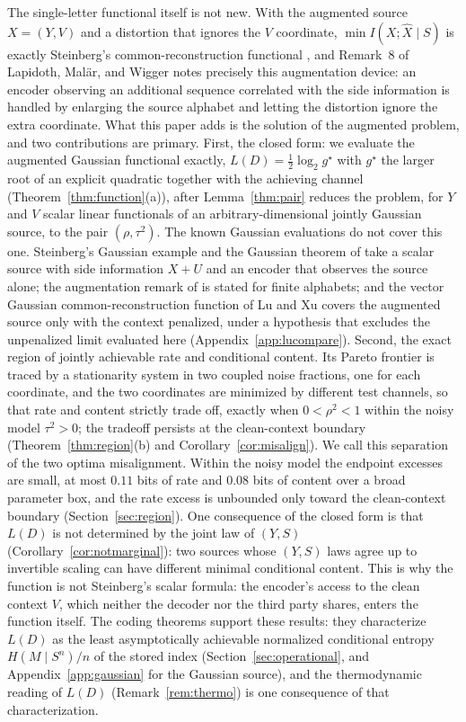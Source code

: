 \documentclass[11pt,onecolumn]{IEEEtran}
\newcommand{\hX}{\widehat{X}}
\begin{document}
The single-letter functional itself is not new. With the augmented source
$X=(Y,V)$ and a distortion that ignores the $V$ coordinate,
$\min I(X;\hX\mid S)$ is exactly Steinberg's common-reconstruction
functional \cite{steinberg2009}, and Remark~8 of Lapidoth, Mal\"ar, and
Wigger \cite{lapidoth2014} notes precisely this augmentation device: an
encoder observing an additional sequence correlated with the side
information is handled by enlarging the source alphabet and letting the
distortion ignore the extra coordinate. What this paper adds is the
solution of the augmented problem, and two contributions are primary.
First, the closed form: we evaluate the augmented Gaussian functional
exactly, $L(D)=\tfrac12\log_2 g^\star$ with $g^\star$ the larger root of
an explicit quadratic together with the achieving channel
(Theorem~\ref{thm:function}(a)), after Lemma~\ref{thm:pair} reduces the
problem, for $Y$ and $V$ scalar linear functionals of an
arbitrary-dimensional jointly Gaussian source, to the pair
$(\rho,\tau^2)$. The known Gaussian evaluations do not cover this one.
Steinberg's Gaussian example \cite{steinberg2009} and the Gaussian
theorem of \cite{lapidoth2014} take a scalar source with side
information $X+U$ and an encoder that observes the source alone; the
augmentation remark of \cite{lapidoth2014} is stated for finite
alphabets; and the vector Gaussian common-reconstruction function of Lu
and Xu \cite{luxu2021} covers the augmented source only with the context
penalized, under a hypothesis that excludes the unpenalized limit
evaluated here (Appendix~\ref{app:lucompare}). Second, the
exact region of jointly achievable rate and conditional content. Its
Pareto frontier is traced by a stationarity system in two coupled noise
fractions, one for each coordinate, and the two coordinates are minimized
by different test channels, so that rate and content strictly trade off,
exactly when $0<\rho^2<1$ within the noisy model $\tau^2>0$; the
tradeoff persists at the clean-context boundary
(Theorem~\ref{thm:region}(b) and Corollary~\ref{cor:misalign}). We call
this separation of the two optima misalignment. Within the noisy model
the endpoint excesses are small, at most $0.11$ bits of rate and $0.08$
bits of content over a broad parameter box, and the rate excess is
unbounded only toward the clean-context boundary
(Section~\ref{sec:region}). One consequence of the
closed form is that $L(D)$ is not determined by the joint law of $(Y,S)$
(Corollary~\ref{cor:notmarginal}): two sources whose $(Y,S)$ laws agree up
to invertible scaling can have different minimal conditional content.
This is why the function is not Steinberg's scalar formula: the encoder's
access to the clean context $V$, which neither the decoder nor the third
party shares, enters the function itself. The coding theorems support
these results: they characterize $L(D)$ as the least asymptotically
achievable normalized conditional entropy $H(M\mid S^n)/n$ of the stored
index (Section~\ref{sec:operational}, and Appendix~\ref{app:gaussian} for
the Gaussian source), and the thermodynamic reading of $L(D)$
(Remark~\ref{rem:thermo}) is one consequence of that characterization.
\end{document}
